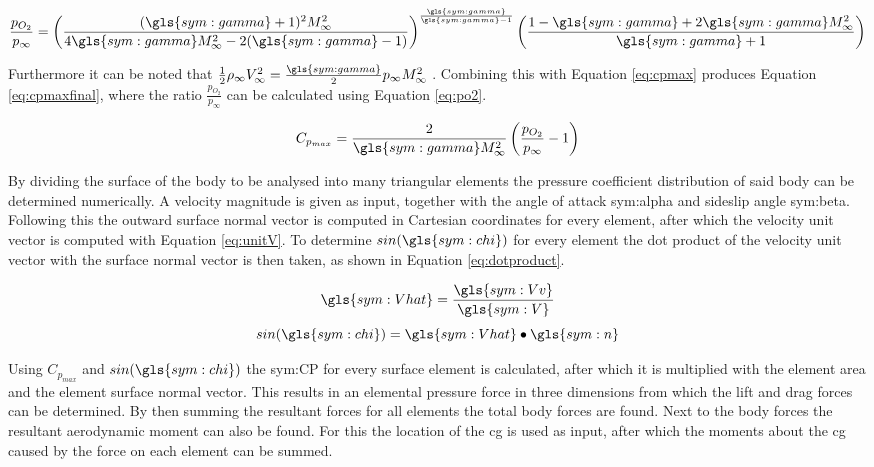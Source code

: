 \begin{equation}
\frac{p_{O_{2}}}{p_{\infty}}=\left(\frac{(\gls{sym:gamma}+1)^{2}M_{\infty}^{2}}{4\gls{sym:gamma} M_{\infty}^{2}-2(\gls{sym:gamma}-1)}\right)^{\frac{\gls{sym:gamma}}{\gls{sym:gamma}-1}}\left(\frac{1-\gls{sym:gamma}+2\gls{sym:gamma} M_{\infty}^{2}}{\gls{sym:gamma}+1}\right)
\label{eq:po2}
\end{equation}

Furthermore it can be noted that $\frac{1}{2}\rho_{\infty}V_{\infty}^{2}=\frac{\gls{sym:gamma}}{2}p_{\infty}M_{\infty}^{2}$ \cite{AndersonJr.2007}. Combining this with Equation \ref{eq:cpmax} produces Equation \ref{eq:cpmaxfinal}, where the ratio $\frac{p_{O_{2}}}{p_{\infty}}$ can be calculated using Equation \ref{eq:po2}.

\begin{equation}
C_{p_{max}}=\frac{2}{\gls{sym:gamma} M_{\infty}^{2}}\left(\frac{p_{O_{2}}}{p_{\infty}}-1\right)
\label{eq:cpmaxfinal}
\end{equation}

By dividing the surface of the body to be analysed into many triangular elements the pressure coefficient distribution of said body can be determined numerically. A velocity magnitude is given as input, together with the angle of attack \gls{sym:alpha} and sideslip angle \gls{sym:beta}. Following this the outward surface normal vector is computed in Cartesian coordinates for every element, after which the velocity unit vector is computed with Equation \ref{eq:unitV}. To determine $sin(\gls{sym:chi})$ for every element the dot product of the velocity unit vector with the surface normal vector is then taken, as shown in Equation \ref{eq:dotproduct}.
\begin{multicols}{2}
\begin{equation}
\gls{sym:Vhat}=\frac{\gls{sym:Vv}}{\gls{sym:V}}
\label{eq:unitV}
\end{equation} \break
\begin{equation}
sin(\gls{sym:chi})=\gls{sym:Vhat} \bullet \gls{sym:n}
\label{eq:dotproduct}
\end{equation}
\end{multicols}
Using $C_{p_{max}}$ and $sin(\gls{sym:chi})$ the \gls{sym:CP} for every surface element is calculated, after which it is multiplied with the element area and the element surface normal vector. This results in an elemental pressure force in three dimensions from which the lift and drag forces can be determined. By then summing the resultant forces for all elements the total body forces are found. Next to the body forces the resultant aerodynamic moment can also be found. For this the location of the \acrfull{cg} is used as input, after which the moments about the \gls{cg} caused by the force on each element can be summed. 


